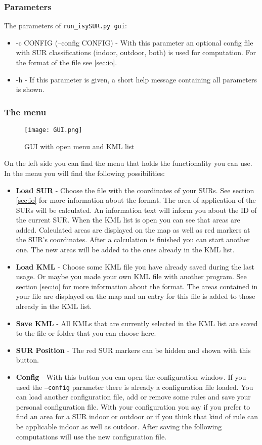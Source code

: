 \documentclass[11pt,fleqn]{book} %
\begin{document}
\subsubsection{Parameters}
The parameters of \texttt{run\_isySUR.py gui}:
\begin{itemize}
	\item -c CONFIG (--config CONFIG) - With this parameter an optional config file with SUR classifications (indoor, outdoor, both) is used for computation. For the format of the file see \ref{sec:io}.
	\item -h - If this parameter is given, a short help message containing all parameters is shown.
\end{itemize}

\subsubsection{The menu}
\begin{figure}
\centering
\texttt{[image: GUI.png]}
\caption{GUI with open menu and KML list}
\end{figure}
On the left side you can find the menu that holds the functionality you can use. In the menu you will find the following possibilities:
\begin{itemize}
	\item \textbf{Load SUR} - Choose the file with the coordinates of your SURs. See section \ref{sec:io} for more information about the format. The area of application of the SURs will be calculated. An information text will inform you about the ID of the current SUR. When the KML list is open you can see that areas are added. Calculated areas are displayed on the map as well as red markers at the SUR's coordinates. After a calculation is finished you can start another one. The new areas will be added to the ones already in the KML list.
	\item \textbf{Load KML} - Choose some KML file you have already saved during the last usage. Or maybe you made your own KML file with another program. See section \ref{sec:io} for more information about the format. The areas contained in your file are displayed on the map and an entry for this file is added to those already in the KML list.
	\item \textbf{Save KML} - All KMLs that are currently selected in the KML list are saved to the file or folder that you can choose here.
	\item \textbf{SUR Position} - The red SUR markers can be hidden and shown with this button.
	\item \textbf{Config} - With this button you can open the configuration window. If you used the \texttt{--config} parameter there is already a configuration file loaded. You can load another configuration file, add or remove some rules and save your personal configuration file. With your configuration you say if you prefer to find an area for a SUR indoor or outdoor or if you think that kind of rule can be applicable indoor as well as outdoor. After saving the following computations will use the new configuration file.
\end{itemize}
\end{document}
